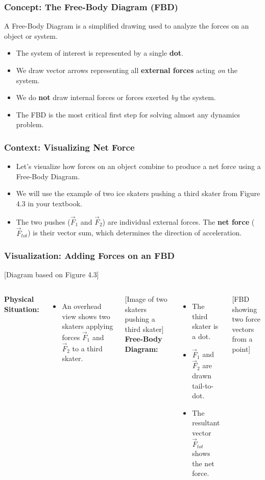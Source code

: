 \documentclass{beamer}
\begin{document}
\begin{frame}
\frametitle{Concept: The Free-Body Diagram (FBD)}
A Free-Body Diagram is a simplified drawing used to analyze the forces on an object or system.
\begin{itemize}
    \item The system of interest is represented by a single \textbf{dot}. \pause
    \item We draw vector arrows representing all \textbf{external forces} acting \textit{on} the system. \pause
    \item We do \textbf{not} draw internal forces or forces exerted \textit{by} the system. \pause
    \item The FBD is the most critical first step for solving almost any dynamics problem.
\end{itemize}
\end{frame}

\begin{frame}
\frametitle{Context: Visualizing Net Force}
\begin{itemize}
    \item Let's visualize how forces on an object combine to produce a net force using a Free-Body Diagram.
    \pause
    \item We will use the example of two ice skaters pushing a third skater from Figure 4.3 in your textbook.
    \pause
    \item The two pushes ($\vec{F}_1$ and $\vec{F}_2$) are individual external forces. The \textbf{net force} ($\vec{F}_{tot}$) is their vector sum, which determines the direction of acceleration.
\end{itemize}
\end{frame}

\begin{frame}
\frametitle{Visualization: Adding Forces on an FBD}
\begin{alertblock}{[Diagram based on Figure 4.3]}
\begin{columns}[T]
    \textbf{Physical Situation:}
    \begin{itemize}
        \item An overhead view shows two skaters applying forces $\vec{F}_1$ and $\vec{F}_2$ to a third skater.
    \end{itemize}
    \alert{[Image of two skaters pushing a third skater]}
    \textbf{Free-Body Diagram:}
    \begin{itemize}
        \item The third skater is a dot.
        \item $\vec{F}_1$ and $\vec{F}_2$ are drawn tail-to-dot.
        \item The resultant vector $\vec{F}_{tot}$ shows the net force.
    \end{itemize}
    \alert{[FBD showing two force vectors from a point]}
\end{columns}
\end{alertblock}
\end{frame}
\end{document}
